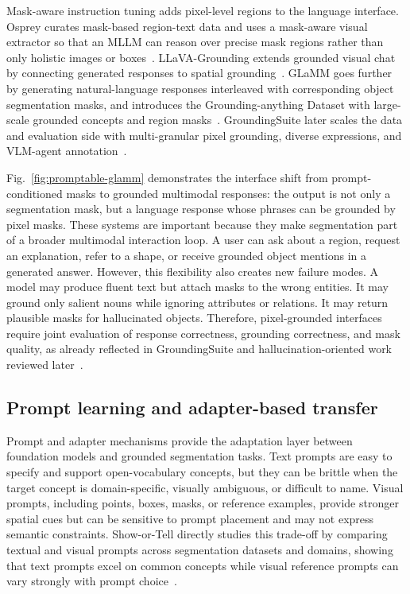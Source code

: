 Mask-aware instruction tuning adds pixel-level regions to the language interface. Osprey curates mask-based region-text data and uses a mask-aware visual extractor so that an MLLM can reason over precise mask regions rather than only holistic images or boxes~\citep{yuanOspreyPixelUnderstanding2024}. LLaVA-Grounding extends grounded visual chat by connecting generated responses to spatial grounding~\citep{zhangLlavagroundingGroundedVisual2024}. GLaMM goes further by generating natural-language responses interleaved with corresponding object segmentation masks, and introduces the Grounding-anything Dataset with large-scale grounded concepts and region masks~\citep{rasheedGlammPixelGrounding2024}. GroundingSuite later scales the data and evaluation side with multi-granular pixel grounding, diverse expressions, and VLM-agent annotation~\citep{huGroundingSuiteMeasuringComplex2025}.


Fig.~\ref{fig:promptable-glamm} demonstrates the interface shift from prompt-conditioned masks to grounded multimodal responses: the output is not only a segmentation mask, but a language response whose phrases can be grounded by pixel masks. These systems are important because they make segmentation part of a broader multimodal interaction loop. A user can ask about a region, request an explanation, refer to a shape, or receive grounded object mentions in a generated answer. However, this flexibility also creates new failure modes. A model may produce fluent text but attach masks to the wrong entities. It may ground only salient nouns while ignoring attributes or relations. It may return plausible masks for hallucinated objects. Therefore, pixel-grounded interfaces require joint evaluation of response correctness, grounding correctness, and mask quality, as already reflected in GroundingSuite and hallucination-oriented work reviewed later~\citep{huGroundingSuiteMeasuringComplex2025,guoSeeingBelievingRichContext2026}.

\subsection{Prompt learning and adapter-based transfer}

Prompt and adapter mechanisms provide the adaptation layer between foundation models and grounded segmentation tasks. Text prompts are easy to specify and support open-vocabulary concepts, but they can be brittle when the target concept is domain-specific, visually ambiguous, or difficult to name. Visual prompts, including points, boxes, masks, or reference examples, provide stronger spatial cues but can be sensitive to prompt placement and may not express semantic constraints. Show-or-Tell directly studies this trade-off by comparing textual and visual prompts across segmentation datasets and domains, showing that text prompts excel on common concepts while visual reference prompts can vary strongly with prompt choice~\citep{grosiShowTellBenchmark2025}.

